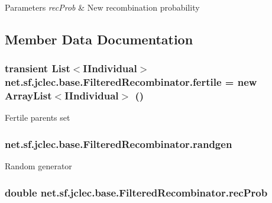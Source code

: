 \begin{DoxyParams}{Parameters}
{\em rec\-Prob} & New recombination probability \\
\hline
\end{DoxyParams}


\subsection{Member Data Documentation}
\hypertarget{classnet_1_1sf_1_1jclec_1_1base_1_1_filtered_recombinator_a11a8bd963d9617d71aa5b2cb834940b6}{
\subsubsection[{fertile}]{\setlength{\rightskip}{0pt plus 5cm}transient List$<${\bf I\-Individual}$>$ net.\-sf.\-jclec.\-base.\-Filtered\-Recombinator.\-fertile = new Array\-List$<${\bf I\-Individual}$>$ ()\hspace{0.3cm}{\ttfamily [protected]}}}\label{classnet_1_1sf_1_1jclec_1_1base_1_1_filtered_recombinator_a11a8bd963d9617d71aa5b2cb834940b6}
Fertile parents set \hypertarget{classnet_1_1sf_1_1jclec_1_1base_1_1_filtered_recombinator_a8799959adcafbfb3928ed5b901925930}{
\subsubsection[{randgen}]{ net.\-sf.\-jclec.\-base.\-Filtered\-Recombinator.\-randgen\hspace{0.3cm}{\ttfamily [protected]}}}\label{classnet_1_1sf_1_1jclec_1_1base_1_1_filtered_recombinator_a8799959adcafbfb3928ed5b901925930}
Random generator \hypertarget{classnet_1_1sf_1_1jclec_1_1base_1_1_filtered_recombinator_acadc9204c4432d1bb6ff5e8f4a085267}{
\subsubsection[{rec\-Prob}]{\setlength{\rightskip}{0pt plus 5cm}double net.\-sf.\-jclec.\-base.\-Filtered\-Recombinator.\-rec\-Prob\hspace{0.3cm}{\ttfamily [protected]}}}\label{classnet_1_1sf_1_1jclec_1_1base_1_1_filtered_recombinator_acadc9204c4432d1bb6ff5e8f4a085267}
